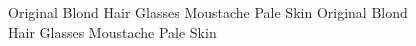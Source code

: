 \begin{figure}[t]
    \centering
    \scriptsize
    	Original \quad\; Blond Hair \quad\; Glasses \quad\; Moustache \quad\; Pale Skin \quad\quad Original \quad\; Blond Hair \quad\; Glasses \quad\; Moustache \quad\; Pale Skin \\
\end{figure}

